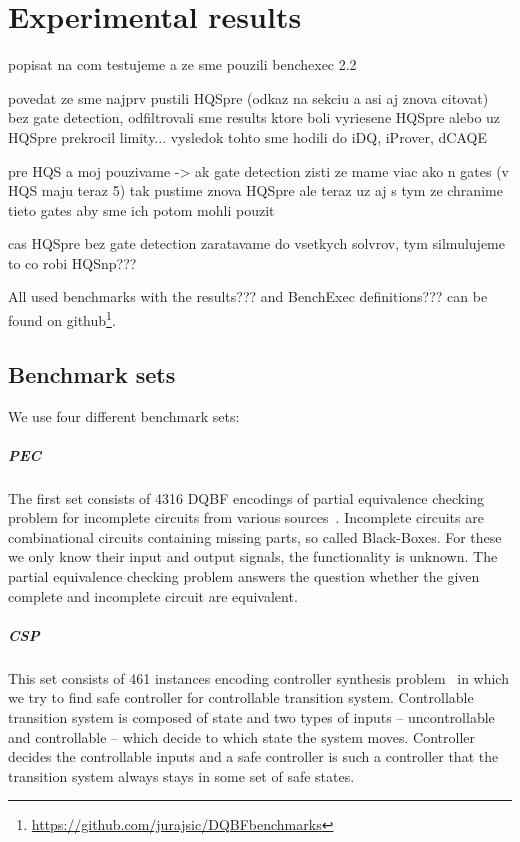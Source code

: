 \documentclass[
  digital, %
  color,
  twoside, %
  table,   %
  nolof,     %
  nolot,     %
]{fithesis3}
\theoremstyle{definition}
\theoremstyle{remark}
\begin{document}

\chapter{Experimental results}
popisat na com testujeme a ze sme pouzili benchexec 2.2~\cite{benchexec}

povedat ze sme najprv pustili HQSpre (odkaz na sekciu a asi aj znova citovat) bez gate detection, odfiltrovali sme results ktore boli vyriesene HQSpre alebo uz HQSpre prekrocil limity... vysledok tohto sme hodili do iDQ, iProver, dCAQE

pre HQS a moj pouzivame -> ak gate detection zisti ze mame viac ako n gates (v HQS maju teraz 5) tak pustime znova HQSpre ale teraz uz aj s tym ze chranime tieto gates aby sme ich potom mohli pouzit

cas HQSpre bez gate detection zaratavame do vsetkych solvrov, tym silmulujeme to co robi HQSnp???

All used benchmarks with the results??? and BenchExec definitions??? can be found on github\footnote{\url{https://github.com/jurajsic/DQBFbenchmarks}}.

\section{Benchmark sets}
We use four different benchmark sets:

\paragraph{PEC}
The first set consists of 4316 DQBF encodings of partial equivalence checking problem for incomplete circuits from various sources~\cite{iDQandDQDIMACS,FastDQBFRefutation,HQSsimpleAlg,PECScholl}. Incomplete circuits are combinational circuits containing missing parts, so called Black-Boxes. For these we only know their input and output signals, the functionality is unknown. The partial equivalence checking problem answers the question whether the given complete and incomplete circuit are equivalent.

\paragraph{CSP}
This set consists of 461 instances encoding controller synthesis problem~\cite{CSPbenchmarks} in which we try to find safe controller for controllable transition system. Controllable transition system is composed of state and two types of inputs -- uncontrollable and controllable -- which decide to which state the system moves. Controller decides the controllable inputs and a safe controller is such a controller that the transition system always stays in some set of safe states.
\end{document}
